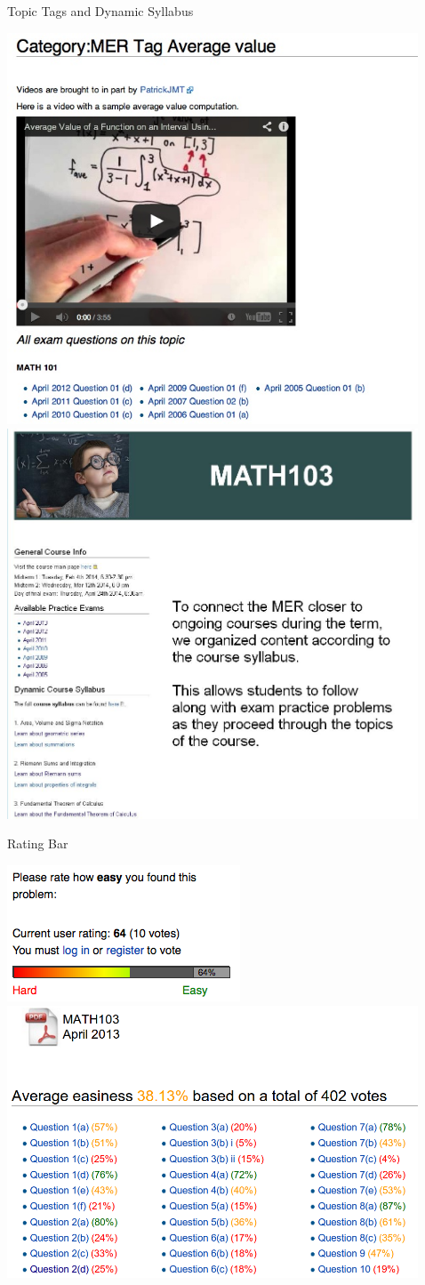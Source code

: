 \documentclass[final]{beamer}
\newlength{\sepwid}
\newlength{\onecolwid}
\begin{document}
\begin{frame}[t]
\begin{columns}[t]
\begin{column}{\onecolwid}
\end{column} %
%
%

\begin{column}{\sepwid}\end{column} %

\begin{column}{\onecolwid} %


\begin{block}{Topic Tags and Dynamic Syllabus}

\begin{center}
\includegraphics[width=.35\textwidth]{tag_with_video2.jpg} \includegraphics[width=.35\textwidth]{DynamicSyllabus.JPG}
\end{center}

\end{block}






\begin{block}{Rating Bar}

\begin{center}
\includegraphics[width=.4\textwidth]{ratingBar.png} \includegraphics[width=.4\textwidth]{M103_exampage_rating.png}
\end{center}


\end{block}
\end{column}
\end{columns}
\end{frame}
\end{document}
